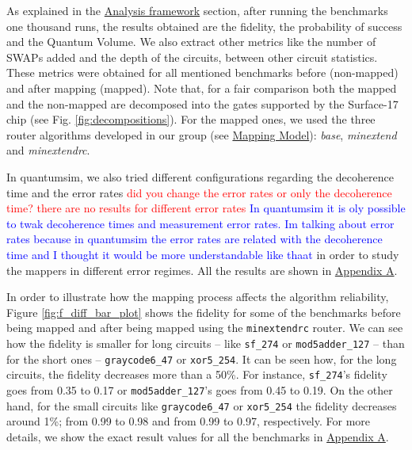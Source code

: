 As explained in the \href{chapter-4.org}{Analysis framework} section, after running the benchmarks one thousand runs, the results obtained are the fidelity, the probability of success and the Quantum Volume.
We also extract other metrics like the number of SWAPs added and the depth of the circuits, between other circuit statistics.
These metrics were obtained for all mentioned benchmarks before (non-mapped) and after mapping (mapped). Note that, for a fair comparison both the mapped and the non-mapped are  decomposed into the gates supported by  the Surface-17 chip (see Fig. \ref{fig:decompositions}). For the mapped ones, we used the three router algorithms developed in our group (see \hyperref[sec:org19dc500]{Mapping Model}): \textit{base}, \textit{minextend} and \textit{minextendrc}.

In quantumsim, we also tried different configurations regarding the decoherence time and the error rates \textcolor{red}{did you change the error rates or only the decoherence time? there are no results for different error rates} \textcolor{blue}{In quantumsim it is oly possible to twak decoherence times and measurement error rates. Im talking about error rates because in quantumsim the error rates are related with the decoherence time and I thought it would be more understandable like thaat } in order to study the mappers in different error regimes. 
All the results are shown in \href{appendix-1.org}{Appendix A}.


In order to illustrate how the mapping process affects the algorithm reliability, Figure \ref{fig:f_diff_bar_plot} shows the fidelity for some of the benchmarks before being mapped and after being mapped using the \texttt{minextendrc} router.
We can see how the fidelity is smaller for long circuits -- like \texttt{sf\_274} or \texttt{mod5adder\_127} -- than for the short ones -- \texttt{graycode6\_47} or \texttt{xor5\_254}.
It can be seen how, for the long circuits, the fidelity decreases more than a 50\%.
For instance, \texttt{sf\_274}'s fidelity goes from 0.35 to 0.17 or \texttt{mod5adder\_127}'s goes from 0.45 to 0.19.
On the other hand, for the small circuits like \texttt{graycode6\_47} or \texttt{xor5\_254} the fidelity decreases around 1\%; from 0.99 to 0.98 and from 0.99 to 0.97, respectively.
For more details, we show the exact result values for all the benchmarks in \href{appendix-1.org}{Appendix A}.

